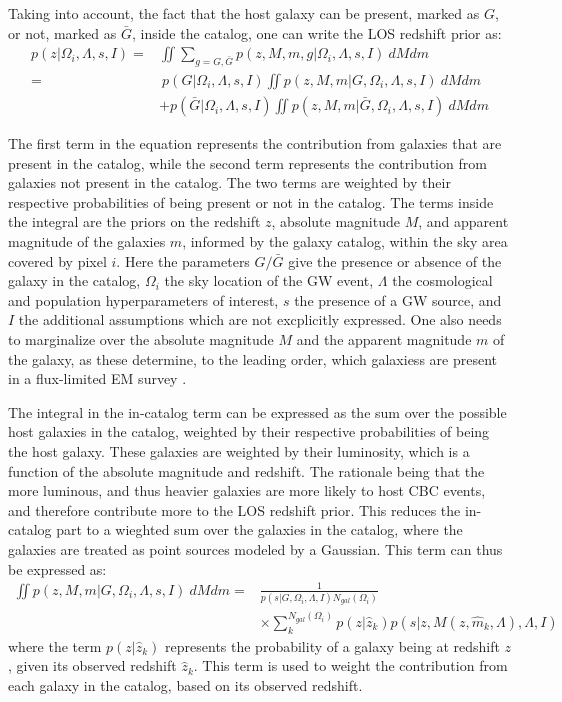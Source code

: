 Taking into account, the fact that the host galaxy can be present, marked as $G$, or not, marked as $\bar{G}$, inside the catalog, one can write the \ac{LOS} redshift prior as:
\begin{align}
  p(z|\Omega_i, \Lambda, s, I) =& \iint \sum_{g=G,\bar{G}} p(z, M, m,g|\Omega_i, \Lambda, s, I)~dM dm \\
  =&~p(G|\Omega_i, \Lambda, s, I) \iint p(z, M, m|G,\Omega_i, \Lambda, s, I)~dM dm \nonumber \\
  &+ p(\bar{G}|\Omega_i, \Lambda, s, I) \iint p(z, M, m|\bar{G},\Omega_i, \Lambda, s, I)~dM dm
\end{align}

The first term in the equation represents the contribution from galaxies that are present in the catalog, while the second term represents the contribution from galaxies not present in the catalog. The two terms are weighted by their respective probabilities of being present or not in the catalog. The terms inside the integral are the priors on the redshift $z$, absolute magnitude $M$, and apparent magnitude of the galaxies $m$, informed by the galaxy catalog, within the sky area covered by pixel $i$. Here the parameters $G/\bar{G}$ give the presence or absence of the galaxy in the catalog, $\Omega_i$ the sky location of the \ac{GW} event, $\Lambda$ the cosmological and population hyperparameters of interest, $s$ the presence of a \ac{GW} source, and $I$ the additional assumptions which are not excplicitly expressed. One also needs to marginalize over the absolute magnitude $M$ and the apparent magnitude $m$ of the galaxy, as these determine, to the leading order, which galaxiess are present in a flux-limited \ac{EM} survey \citep{gray2023joint}.

The integral in the in-catalog term can be expressed as the sum over the possible host galaxies in the catalog, weighted by their respective probabilities of being the host galaxy. These galaxies are weighted by their luminosity, which is a function of the absolute magnitude and redshift. The rationale being that the more luminous, and thus heavier galaxies are more likely to host \ac{CBC} events, and therefore contribute more to the \ac{LOS} redshift prior. This reduces the in-catalog part to a wieghted sum over the galaxies in the catalog, where the galaxies are treated as point sources modeled by a Gaussian. This term can thus be expressed as:
\begin{align}
  \iint p(z, M, m|G,\Omega_i, \Lambda, s, I)~dM dm =& \frac{1}{p(s|G,\Omega_i, \Lambda, I)N_{gal}(\Omega_i)} \nonumber\\ 
  &\times \sum_{k}^{N_{gal}(\Omega_i)} p(z|\hat{z}_k) p(s|z, M(z, \hat{m}_k, \Lambda), \Lambda, I)
\end{align}
where the term $p(z|\hat{z}_k)$ represents the probability of a galaxy being at redshift $z$, given its observed redshift $\hat{z}_k$. This term is used to weight the contribution from each galaxy in the catalog, based on its observed redshift.

